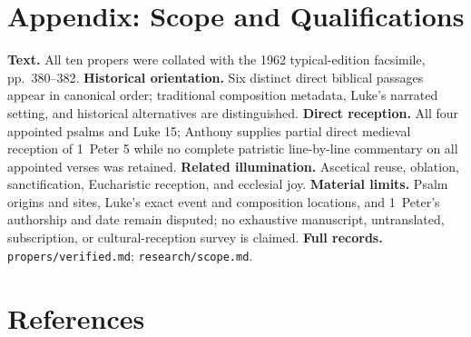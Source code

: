 \begin{deepstudy}

\section*{Appendix: Scope and Qualifications}

\begin{studyframe}
\textbf{Text.} All ten propers were collated with the 1962 typical-edition facsimile, pp.~380--382. \textbf{Historical orientation.} Six distinct direct biblical passages appear in canonical order; traditional composition metadata, Luke's narrated setting, and historical alternatives are distinguished. \textbf{Direct reception.} All four appointed psalms and Luke 15; Anthony supplies partial direct medieval reception of 1~Peter 5 while no complete patristic line-by-line commentary on all appointed verses was retained. \textbf{Related illumination.} Ascetical reuse, oblation, sanctification, Eucharistic reception, and ecclesial joy. \textbf{Material limits.} Psalm origins and sites, Luke's exact event and composition locations, and 1~Peter's authorship and date remain disputed; no exhaustive manuscript, untranslated, subscription, or cultural-reception survey is claimed. \textbf{Full records.} \nolinkurl{propers/verified.md}; \nolinkurl{research/scope.md}.
\end{studyframe}

\section*{References}


\end{deepstudy}
